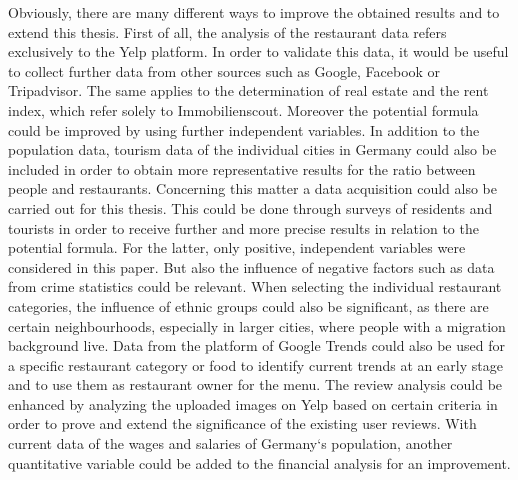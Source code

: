 Obviously, there are many different ways to improve the obtained results and to extend this thesis. First of all, the analysis of the restaurant data refers exclusively to the Yelp platform. In order to validate this data, it would be useful to collect further data from other sources such as Google, Facebook or Tripadvisor. The same applies to the determination of real estate and the rent index, which refer solely to Immobilienscout. \newline
Moreover the potential formula could be improved by using further independent variables. In addition to the population data, tourism data of the individual cities in Germany could also be included in order to obtain more representative results for the ratio between people and restaurants. Concerning this matter a data acquisition could also be carried out for this thesis. This could be done through surveys of residents and tourists in order to receive further and more precise results in relation to the potential formula. For the latter, only positive, independent variables were considered in this paper. But also the influence of negative factors such as data from crime statistics could be relevant. \newline
When selecting the individual restaurant categories, the influence of ethnic groups could also be significant, as there are certain neighbourhoods, especially in larger cities, where people with a migration background live. Data from the platform of Google Trends could also be used for a specific restaurant category or food to identify current trends at an early stage and to use them as restaurant owner for the menu. \newline
The review analysis could be enhanced by analyzing the uploaded images on Yelp based on certain criteria in order to prove and extend the significance of the existing user reviews. With current data of the wages and salaries of Germany‘s population, another quantitative variable could be added to the financial analysis for an improvement. 
